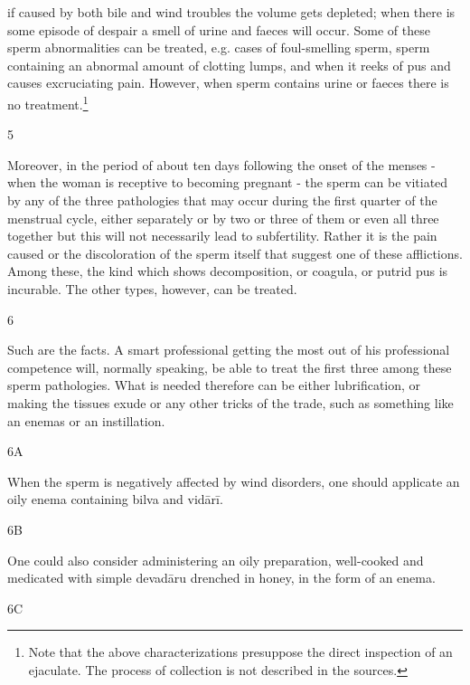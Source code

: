 \begin{translation}
      if caused by both bile and wind troubles the volume gets 
  depleted; when there is some episode of despair a smell of urine and faeces will 
  occur. Some of these sperm abnormalities can be treated, e.g. cases of 
  foul-smelling sperm, sperm containing an abnormal amount of clotting lumps, 
  and when it reeks of pus and causes excruciating pain. However, when sperm 
  contains urine or faeces there is no treatment.\footnote{Note that the above
      characterizations presuppose the direct inspection of an ejaculate.  The 
      process of collection is not described in the sources.}
 
 \item[5]
 
  Moreover, in the period of about ten days following the onset of the menses - 
  when the woman is receptive to becoming pregnant - the sperm can be vitiated 
  by any of the three pathologies that may occur during the first quarter of the 
  menstrual cycle, either separately or by two or three of them or even all three 
  together but this will not necessarily lead to subfertility. Rather it is  the pain 
  caused or the discoloration of the sperm itself that suggest one of these 
  afflictions. Among these, the kind which shows decomposition, or coagula, or 
  putrid pus is incurable. The other types, however, can be treated.  
 
 \item[6]
 
 Such are the facts. A smart professional getting the most out of his 
 professional competence will, normally speaking, be able to treat the first three 
 among these sperm pathologies. What is needed therefore can be either 
 lubrification, or making the tissues exude or any other tricks of the trade, such 
 as something like an enemas or an instillation.
 
 \item[6A]
 
  When the sperm is negatively affected by wind disorders, one should applicate 
  an oily enema containing \gls{bilva} and \gls{vidārī}. 
 
 \item[6B]
 
  One could also consider administering an oily preparation, well-cooked and 
  medicated with simple \gls{devadāru} drenched in honey, in the form of an 
  enema. 
 
 \item[6C]
 

\end{translation}
